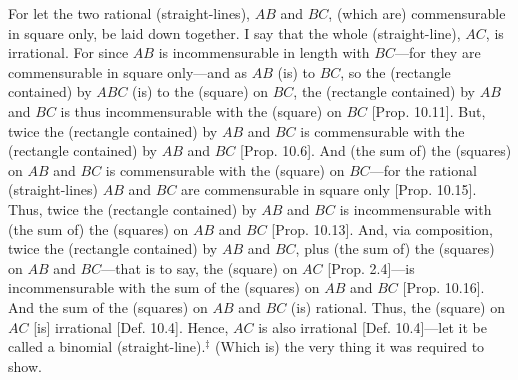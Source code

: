 \begin{Parallel}{}{}
{For let the two rational (straight-lines), $AB$ and $BC$, (which are)
commensurable in square only, be laid down together. I say that the
whole (straight-line), $AC$, is irrational.
For since $AB$ is incommensurable in length with $BC$---for they
are commensurable in square only---and as $AB$ (is) to $BC$, so
the (rectangle contained) by $ABC$ (is) to the (square) on $BC$, the (rectangle contained)
by $AB$ and $BC$ is thus incommensurable with the
(square) on $BC$ [Prop. 10.11]. But,
twice the (rectangle contained) by $AB$ and $BC$ is commensurable
with the (rectangle contained) by $AB$ and $BC$ [Prop. 10.6]. And (the sum of) the (squares) on
$AB$ and $BC$
 is commensurable with the (square) on $BC$---for the rational (straight-lines) $AB$ and $BC$ are commensurable in square only [Prop. 10.15].
Thus, twice the (rectangle contained) by $AB$ and $BC$ is incommensurable
with (the sum of) the (squares) on $AB$ and $BC$ [Prop. 10.13]. And, via composition, twice
the (rectangle contained) by $AB$ and $BC$, plus (the sum of) the (squares)
on $AB$ and $BC$---that is to say, the (square) on $AC$ [Prop. 2.4]---is incommensurable with the
sum of the (squares) on $AB$ and $BC$ [Prop. 10.16]. And the sum of the (squares) on $AB$ and $BC$ (is) rational. Thus, the (square) on $AC$ [is]
irrational [Def. 10.4]. Hence, $AC$
is also irrational [Def. 10.4]---let it be called
a binomial (straight-line).$^\ddag$  (Which is) the very thing it was required to show.}
\end{Parallel}



